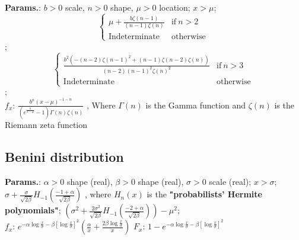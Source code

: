     {\color{darkblue} \textbf{Params.}:} {$b>0$ scale,  $ n> 0$ shape,  $\mu>0$ location}; {$x>\mu$}; {$$\begin{cases}
              \mu + \frac{b\zeta(n-1)}{(n-1)\zeta(n)} & \text{if}\ n>2    \\
              \text{Indeterminate} & \text{otherwise}\ \end{cases}$$}; {$$\begin{cases}
              \frac{ b^2 \left( -(n-2){\zeta(n-1)}^2+(n-1)\zeta(n-2)\zeta(n) \right)}{(n-2) {(n-1)}^2 {\zeta(n)}^2} & \text{if}\ n>3    \\
              \text{Indeterminate} & \text{otherwise}\ \end{cases}$$};\hspace{0.5cm}\\{\color{darkblue} \textbf{$f_x$}:} {$ \frac{ b^n {(x-\mu)}^{-1-n} }{ \left( e^{\frac{b}{x-\mu}} -1 \right) \Gamma(n) \zeta(n) } $ ,  Where $\Gamma(n)$ is the Gamma function and $\zeta(n)$ is the Riemann zeta function}



    
        
\subsection{Benini distribution}





    {\color{darkblue} \textbf{Params.}:} {$\alpha>0$ shape (real),  $\beta>0$ shape (real),  $\sigma>0$ scale (real)}; {$x>\sigma$}; {$\sigma+\tfrac{\sigma}{\sqrt{2\beta}} H_{-1}\left(\tfrac{-1+\alpha}{\sqrt{2\beta}}\right) $ ,  where $H_n(x)$ is the \textbf{"probabilists' Hermite polynomials"}}; {$\left(\sigma^2+\tfrac{2\sigma^2}{\sqrt{2\beta}} H_{-1}\left(\tfrac{-2+\alpha}{\sqrt{2\beta}}\right)\right)-\mu^2 $};\hspace{0.5cm}\\{\color{darkblue} \textbf{$f_x$}:} {$e^{-\alpha\log{\frac{x}{\sigma}}-\beta\left[\log{\frac{x}{\sigma}}\right]^2} \left(\frac{\alpha}{x}+\frac{2\beta\log{\frac{x}{\sigma}}}{x}\right) $}{\color{darkblue} \textbf{$F_x$}:} {$1-e^{-\alpha\log{\frac{x}{\sigma}}-\beta[\log{\frac{x}{\sigma}}]^2}$}



